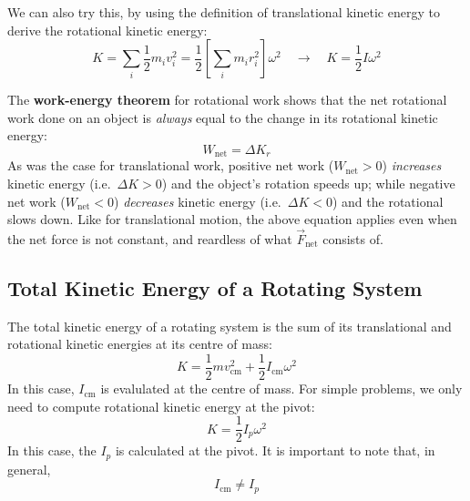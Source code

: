 We can also try this, by using the definition of translational kinetic
energy to derive the rotational kinetic energy:
\begin{equation}
  K=\sum_i\frac12m_iv_i^2=\frac12\left[\sum_i m_ir_i^2\right]\omega^2
  \quad\longrightarrow\quad
  \boxed{K=\frac12I\omega^2}
\end{equation}

The \textbf{work-energy theorem} for rotational work shows that the net
rotational work done on an object is \emph{always} equal to the change in its
rotational kinetic energy:
\begin{equation} 
  \boxed{W_\text{net} = \Delta K_r}
\end{equation}
As was the case for translational work, positive net work ($W_\text{net}>0$)
\emph{increases} kinetic energy (i.e.\ $\Delta K>0$) and the object's rotation
speeds up; while negative net work ($W_\text{net}<0$) \emph{decreases} kinetic
energy (i.e.\ $\Delta K<0$) and the rotational slows down.
Like for translational motion, the above equation applies even when the net
force is not constant, and reardless of what $\vec F_\text{net}$ consists of.


\subsection{Total Kinetic Energy of a Rotating System}

The total kinetic energy of a rotating system is the sum of its translational
and rotational kinetic energies at its centre of mass:
\begin{equation}
  \boxed{
    K=\frac12mv_\text{cm}^2+\frac12I_\text{cm}\omega^2
  }
\end{equation}  
In this case, $I_\text{cm}$ is evalulated at the centre of mass. For simple
problems, we only need to compute rotational kinetic energy at the pivot:
\begin{equation}
  \boxed{
    K=\frac12I_p\omega^2
  }
\end{equation}
In this case, the $I_p$ is calculated at the pivot. It is important to note
that, in general,
\begin{equation*}
  I_\text{cm}\neq I_p
\end{equation*}


